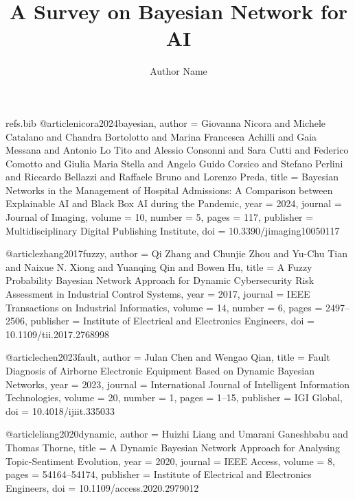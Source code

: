 \begin{filecontents*}[overwrite]{refs.bib}
@article{nicora2024bayesian,
  author = {Giovanna Nicora and Michele Catalano and Chandra Bortolotto and Marina Francesca Achilli and Gaia Messana and Antonio Lo Tito and Alessio Consonni and Sara Cutti and Federico Comotto and Giulia Maria Stella and Angelo Guido Corsico and Stefano Perlini and Riccardo Bellazzi and Raffaele Bruno and Lorenzo Preda},
  title = {{Bayesian Networks in the Management of Hospital Admissions: A Comparison between Explainable AI and Black Box AI during the Pandemic}},
  year = {2024},
  journal = {Journal of Imaging},
  volume = {10},
  number = {5},
  pages = {117},
  publisher = {Multidisciplinary Digital Publishing Institute},
  doi = {10.3390/jimaging10050117}
}

@article{zhang2017fuzzy,
  author = {Qi Zhang and Chunjie Zhou and Yu{-}Chu Tian and Naixue N. Xiong and Yuanqing Qin and Bowen Hu},
  title = {{A Fuzzy Probability Bayesian Network Approach for Dynamic Cybersecurity Risk Assessment in Industrial Control Systems}},
  year = {2017},
  journal = {IEEE Transactions on Industrial Informatics},
  volume = {14},
  number = {6},
  pages = {2497--2506},
  publisher = {Institute of Electrical and Electronics Engineers},
  doi = {10.1109/tii.2017.2768998}
}

@article{chen2023fault,
  author = {Julan Chen and Wengao Qian},
  title = {{Fault Diagnosis of Airborne Electronic Equipment Based on Dynamic Bayesian Networks}},
  year = {2023},
  journal = {International Journal of Intelligent Information Technologies},
  volume = {20},
  number = {1},
  pages = {1--15},
  publisher = {IGI Global},
  doi = {10.4018/ijiit.335033}
}

@article{liang2020dynamic,
  author = {Huizhi Liang and Umarani Ganeshbabu and Thomas Thorne},
  title = {{A Dynamic Bayesian Network Approach for Analysing Topic-Sentiment Evolution}},
  year = {2020},
  journal = {IEEE Access},
  volume = {8},
  pages = {54164--54174},
  publisher = {Institute of Electrical and Electronics Engineers},
  doi = {10.1109/access.2020.2979012}
}
\end{filecontents*}

\documentclass[journal]{IEEEtran}
\usepackage[utf8]{inputenc}
\usepackage[T1]{fontenc}
\usepackage{cite}
\usepackage{amsmath,amssymb}
\usepackage{graphicx}
\usepackage{booktabs}
\usepackage{tabularx}
\usepackage{array}
\usepackage{pgfplots}
\pgfplotsset{compat=1.17}
\usepackage[hidelinks]{hyperref}
\usepackage{url}


\title{A Survey on Bayesian Network for AI}
\author{Author Name}
\maketitle


